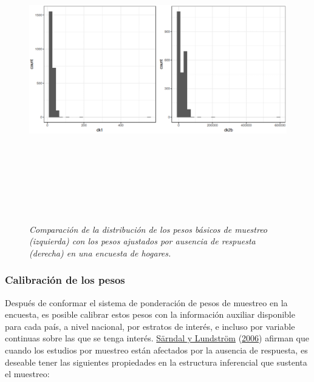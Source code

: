 \documentclass[
  12pt,
  spanish,
]{book}
\begin{document}
\begin{figure}
\centering
\includegraphics[width=\textwidth,height=5.20833in]{Pics/17.png}
\caption{\emph{Comparación de la distribución de los pesos básicos de muestreo (izquierda) con los pesos ajustados por ausencia de respuesta (derecha) en una encuesta de hogares.}}
\end{figure}

\hypertarget{calibraciuxf3n-de-los-pesos}{%
\subsubsection*{Calibración de los pesos}\label{calibraciuxf3n-de-los-pesos}}

Después de conformar el sistema de ponderación de pesos de muestreo en la encuesta, es posible calibrar estos pesos con la información auxiliar disponible para cada país, a nivel nacional, por estratos de interés, e incluso por variable continuas sobre las que se tenga interés. \protect\hyperlink{ref-Sarndal_Lundstrom_2006}{Särndal y Lundström} (\protect\hyperlink{ref-Sarndal_Lundstrom_2006}{2006}) afirman que cuando los estudios por muestreo están afectados por la ausencia de respuesta, es deseable tener las siguientes propiedades en la estructura inferencial que sustenta el muestreo:
\end{document}
